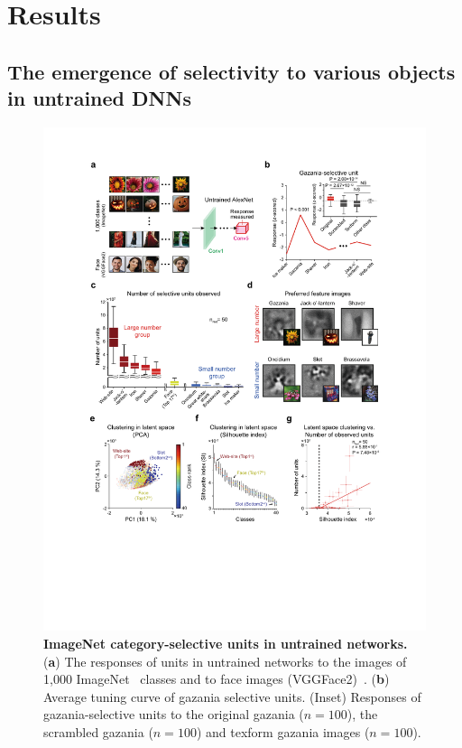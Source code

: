 \documentclass[sn-mathphys-num]{sn-jnl}%
\theoremstyle{thmstyleone}%
\theoremstyle{thmstyletwo}%
\theoremstyle{thmstylethree}%
\begin{document}
\section{Results}\label{sec3}



\subsection{The emergence of selectivity to various objects in untrained DNNs}

\begin{figure}[!htb]
	\centering
	\includegraphics[width=1.0\textwidth]{fig/face_5.pdf}
	\caption{
		\textbf{ImageNet category-selective units in untrained networks.
		}
		(\textbf{a}) The responses of units in untrained networks to the images of 1,000 ImageNet~\cite{russakovsky2015imagenet} classes and to face images (VGGFace2)~\cite{cao2018vggface2}.
		(\textbf{b}) Average tuning curve of gazania selective units.
		(Inset) Responses of gazania-selective units to the original gazania ($ n = 100 $), the scrambled gazania ($ n = 100 $) and texform gazania images ($ n = 100 $).
}
\end{figure}
\end{document}
